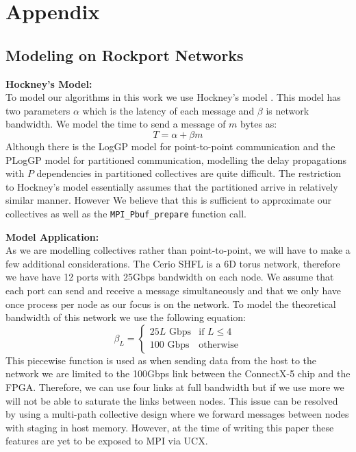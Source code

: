 \documentclass{article}
\begin{document}
  \clearpage
  \appendix
  \section{Appendix}
  \label{app:start}
  \subsection{Modeling on Rockport Networks}
  \noindent
  \textbf{Hockney's Model:}\\
  To model our algorithms in this work we use Hockney's model \cite{Hockney}.
  This model has two parameters $\alpha$ which is the latency of each message
  and $\beta$ is network bandwidth.
  We model the time to send a message of $m$ bytes as:
  \begin{equation}
    T = \alpha + \beta m
  \end{equation}
  Although there is the LogGP model \cite{LogGP} for point-to-point communication and
  the PLogGP model \cite{PLogGP} for partitioned communication,
  modelling the delay propagations with $P$ dependencies in partitioned collectives are quite difficult.
  The restriction to Hockney's model essentially assumes that the partitioned arrive in relatively similar manner.
  However We believe that this is sufficient to approximate our collectives as well
  as the \texttt{MPI\_Pbuf\_prepare} function call.

  \noindent
  \textbf{Model Application:} \\
  As we are modelling collectives rather than point-to-point,
  we will have to make a few additional considerations.
  The Cerio SHFL is a 6D torus network,
  therefore we have have 12 ports with 25Gbps bandwidth on each node.
  We assume that each port can send and receive a message simultaneously
  and that we only have once process per node as our focus is on the network.
  To model the theoretical bandwidth of this network we use the following equation:
  \begin{equation}
    \beta_L =
      \begin{cases}
        25L \text{~Gbps} & \text{if~} L \leq 4 \\
        100 \text{~Gbps} & \text{otherwise}
      \end{cases}
  \end{equation}
  This piecewise function is used as when sending data from the host to the network we are limited
  to the 100Gbps link between the ConnectX-5 chip and the FPGA.
  Therefore,
  we can use four links at full bandwidth but if we use more we will not be able to
  saturate the links between nodes.
  This issue can be resolved by using a multi-path collective design where we
  forward messages between nodes with staging in host memory.
  However,
  at the time of writing this paper these features are yet to be exposed to MPI via UCX.
\end{document}
